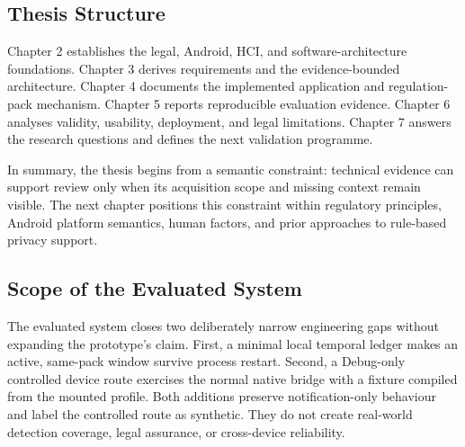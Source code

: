 \subsection{Thesis Structure}

Chapter 2 establishes the legal, Android, HCI, and software-architecture foundations. Chapter 3 derives requirements and the evidence-bounded architecture. Chapter 4 documents the implemented application and regulation-pack mechanism. Chapter 5 reports reproducible evaluation evidence. Chapter 6 analyses validity, usability, deployment, and legal limitations. Chapter 7 answers the research questions and defines the next validation programme.

In summary, the thesis begins from a semantic constraint: technical evidence can support review only when its acquisition scope and missing context remain visible. The next chapter positions this constraint within regulatory principles, Android platform semantics, human factors, and prior approaches to rule-based privacy support.

\subsection{Scope of the Evaluated System}

The evaluated system closes two deliberately narrow engineering gaps without expanding the prototype's claim. First, a minimal local temporal ledger makes an active, same-pack window survive process restart. Second, a Debug-only controlled device route exercises the normal native bridge with a fixture compiled from the mounted profile. Both additions preserve notification-only behaviour and label the controlled route as synthetic. They do not create real-world detection coverage, legal assurance, or cross-device reliability.
